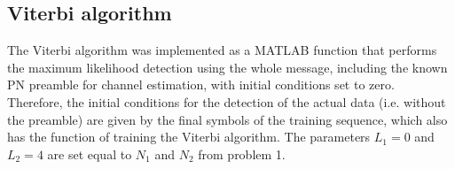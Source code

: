 \documentclass[10pt]{article}
\begin{document}



\subsection*{Viterbi algorithm}
The Viterbi algorithm was implemented as a MATLAB function that performs the maximum likelihood detection using the whole message, including the known PN preamble for channel estimation, with initial conditions set to zero. Therefore, the initial conditions for the detection of the actual data (i.e. without the preamble) are given by the final symbols of the training sequence, which also has the function of training the Viterbi algorithm. The parameters $L_1 = 0$ and $L_2 = 4$ are set equal to $N_1$ and $N_2$ from problem 1.
\end{document}
